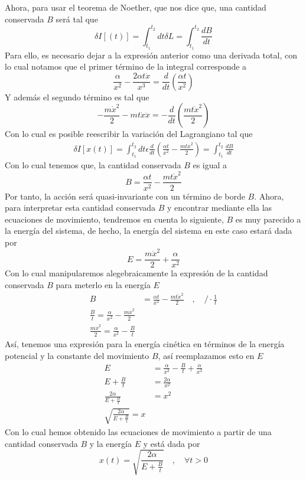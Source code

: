 \documentclass[../main.tex]{subfiles}
\begin{document}
Ahora, para usar el teorema de Noether, que nos dice que, una cantidad conservada $B$ será tal que
\begin{equation}
  \delta I[(t)]=\int_{t_1}^{t_2} dt \delta L= \int_{t_1}^{t_2} \frac{dB}{dt} 
\end{equation}
Para ello, es necesario dejar a la expresión anterior como una derivada total, con lo cual notamos que el primer término de la integral corresponde a
\begin{equation*}
  \frac{\alpha}{x^2} - \frac{2\alpha t \dot{x}}{x^3} = \frac{d}{dt}\left( \frac{\alpha t}{x^2} \right)
\end{equation*}
Y además el segundo término es tal que
\begin{equation*}
  -\frac{m\dot{x}^2}{2} - mt\dot{x}\ddot{x} = -\frac{d}{dt}\left(\frac{mt\dot{x}^2}{2}\right)
\end{equation*}
 Con lo cual es posible reescribir la variación del Lagrangiano tal que
\begin{align*}
  \delta I[x(t)]=  \int_{t_1}^{t_2} dt \epsilon \frac{d}{dt}\left( \frac{\alpha t}{x^2}-\frac{mt\dot{x}^2}{2} \right) = \int_{t_1}^{t_2}\frac{dB}{dt}
\end{align*}
Con lo cual tenemos que, la cantidad  conservada $B$ es igual a 
\begin{equation}
  \boxed{ B = \frac{\alpha t}{x^2} - \frac{mt\dot{x}^2}{2}}
\end{equation}
Por tanto, la acción será quasi-invariante con un término de borde $B$. Ahora, para interpretar esta cantidad conservada $B$ y encontrar mediante ella las ecuaciones de movimiento, tendremos en cuenta lo siguiente, $B$ es muy parecido a la energía del sistema, de hecho, la energía del sistema en este caso estará dada por
\begin{equation*}
  E=\frac{m\dot{x}^2}{2}+\frac{\alpha}{x^2}
\end{equation*}
Con lo cual manipularemos alegebraicamente la expresión de la cantidad conservada $B$ para meterlo en la energía $E$ 
\begin{align*}
  B & = \frac{\alpha t}{x^2} - \frac{mt\dot{x}^2}{2} \quad, \quad /\cdot \frac{1}{t} \\  \frac{B}{t} =  \frac{\alpha}{x^2} - \frac{m\dot{x}^2}{2} \\
  \frac{m\dot{x}^2}{2} = \frac{\alpha}{x^2} - \frac{B}{t}
\end{align*}
Así, tenemos una expresión para la energía cinética en términos de la energía potencial y la constante del movimiento $B$, así reemplazamos esto en $E$
\begin{align*}
  E & = \frac{\alpha}{x^2} - \frac{B}{t} + \frac{\alpha}{x^2} \\
  E + \frac{B}{t} & = \frac{2\alpha}{x^2} \\
  \frac{2\alpha}{E + \frac{B}{t}} & = x^2 \\
  \sqrt{\frac{2\alpha}{E + \frac{B}{t}}} = x 
\end{align*}
Con lo cual hemos obtenido las ecuaciones de movimiento a partir de una cantidad conservada $B$ y la energía $E$ y está dada por
\begin{equation}
 \boxed{  x(t)=\sqrt{\frac{2\alpha}{E+\frac{B}{t}}} \quad , \quad \forall t>0 }
\end{equation}
\end{document}
